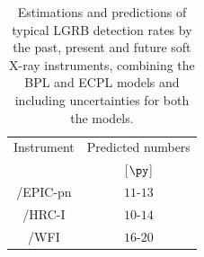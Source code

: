 \begin{table}
\caption[Long GRB detection rates by soft X-ray instruments]{Estimations and predictions of typical LGRB detection rates by the past, present and future soft X-ray instruments, combining the BPL and ECPL models and including uncertainties for both the models.}
\label{tab:predictions_for_soft_X-ray_instruments}
\begin{center}
\begin{tabular}{|c|c|}
\hline 
Instrument & Predicted numbers\\
 & [$\py$]\\
\hline
\hline
\X /EPIC-pn & $11$-$13$\\
\hline
\C /HRC-I & $10$-$14$\\
\hline
\A /WFI & $16$-$20$\\
\hline
\end{tabular}
\end{center}
\end{table}

